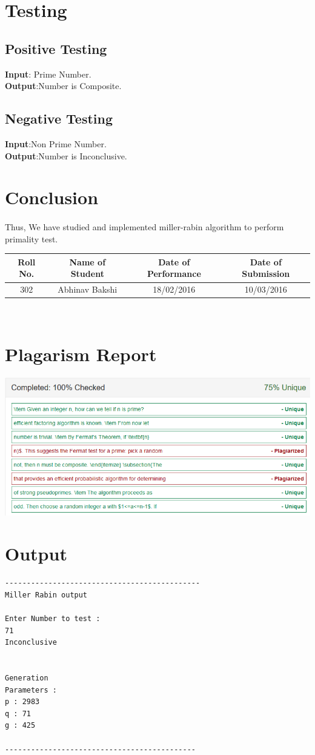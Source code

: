 \documentclass[a4paper,12pt]{article}
\begin{document}
\section{Testing}
\subsection{Positive Testing}

   \textbf{ Input}: Prime Number.\\
    \textbf{Output}:Number is Composite.\\
    
    
\subsection{Negative Testing}
   \textbf{ Input}:Non Prime Number.\\
   \textbf{ Output}:Number is Inconclusive.\\
    
    
\section{Conclusion}
	\paragraph{} Thus, We have studied and implemented miller-rabin algorithm to perform primality test.
\vspace{20px}
\begin{center}
	\begin{tabular}
		{|c|c|c|c|}\hline
		{\bf Roll No.}		&{\bf Name of Student}		&{\bf Date of Performance}  				&{\bf Date of Submission}  \\ \hline
		{302}	&	{Abhinav Bakshi}& {18/02/2016}		&  {10/03/2016}\\ \hline
	\end{tabular}\\ 
\end{center}

\section{Plagarism Report}
\includegraphics[width=\textwidth]{rmpl}
\section{Output}
\begin{verbatim}
---------------------------------------------
Miller Rabin output

Enter Number to test : 
71
Inconclusive


Generation
Parameters : 
p : 2983
q : 71
g : 425

--------------------------------------------
\end{verbatim}
\end{document}
